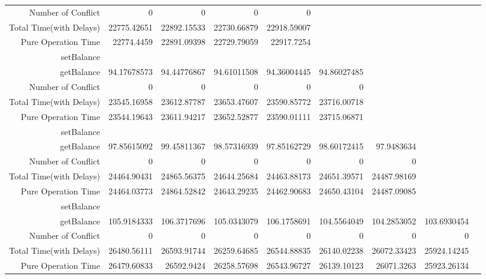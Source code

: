 \begin{landscape}
\begin{table}[htbp]
\begin{tabular}{rrrrrrrrr}
    Number of Conflict & 0     & 0     & 0     & 0     &       &       &       &  \\
    Total Time(with Delays) & 22775.42651 & 22892.15533 & 22730.66879 & 22918.59007 &       &       &       &  \\
    Pure Operation Time & 22774.4459 & 22891.09398 & 22729.79059 & 22917.7254 &       &       &       &  \\
    \cline{1-9}
    setBalance &       &       &       &       &       &       &       &  \\
    getBalance & 94.17678573 & 94.44776867 & 94.61011508 & 94.36004445 & 94.86027485 &       &       &  \\
    Number of Conflict & 0     & 0     & 0     & 0     & 0     &       &       &  \\
    Total Time(with Delays) & 23545.16958 & 23612.87787 & 23653.47607 & 23590.85772 & 23716.00718 &       &       &  \\
    Pure Operation Time & 23544.19643 & 23611.94217 & 23652.52877 & 23590.01111 & 23715.06871 &       &       &  \\
    \cline{1-9}
    setBalance &       &       &       &       &       &       &       &  \\
    getBalance & 97.85615092 & 99.45811367 & 98.57316939 & 97.85162729 & 98.60172415 & 97.9483634 &       &  \\
    Number of Conflict & 0     & 0     & 0     & 0     & 0     & 0     &       &  \\
    Total Time(with Delays) & 24464.90431 & 24865.56375 & 24644.25684 & 24463.88173 & 24651.39571 & 24487.98169 &       &  \\
    Pure Operation Time & 24464.03773 & 24864.52842 & 24643.29235 & 24462.90683 & 24650.43104 & 24487.09085 &       &  \\
    \cline{1-9}
    setBalance &       &       &       &       &       &       &       &  \\
    getBalance & 105.9184333 & 106.3717696 & 105.0343079 & 106.1758691 & 104.5564049 & 104.2853052 & 103.6930454 &  \\
    Number of Conflict & 0     & 0     & 0     & 0     & 0     & 0     & 0     &  \\
    Total Time(with Delays) & 26480.56111 & 26593.91744 & 26259.64685 & 26544.88835 & 26140.02238 & 26072.33423 & 25924.14245 &  \\
    Pure Operation Time & 26479.60833 & 26592.9424 & 26258.57698 & 26543.96727 & 26139.10123 & 26071.3263 & 25923.26134 &  \\

\end{tabular}
\end{table}
\end{landscape}

